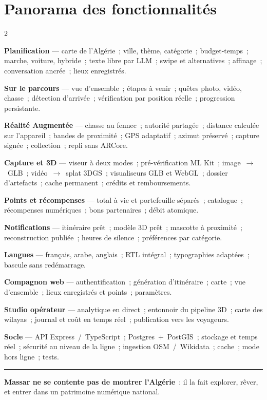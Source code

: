 \documentclass[11pt,a4paper]{article}
\newcommand{\hrulethin}{\vspace{-0.7em}\par\noindent{\color{accent}\rule{\linewidth}{0.5pt}}\par\vspace{-0.45em}}
\begin{document}
\section*{\color{accent}Panorama des fonctionnalités}\hrulethin

{\footnotesize
\begin{multicols}{2}
\raggedright
\textbf{Planification} — carte de l'Algérie~; ville, thème, catégorie~; budget-temps~; marche, voiture, hybride~; texte libre par LLM~; swipe et alternatives~; affinage~; conversation ancrée~; lieux enregistrés.

\textbf{Sur le parcours} — vue d'ensemble~; étapes à venir~; quêtes photo, vidéo, chasse~; détection d'arrivée~; vérification par position réelle~; progression persistante.

\textbf{Réalité Augmentée} — chasse au fennec~; autorité partagée~; distance calculée sur l'appareil~; bandes de proximité~; GPS adaptatif~; azimut préservé~; capture signée~; collection~; repli sans ARCore.

\textbf{Capture et 3D} — viseur à deux modes~; pré-vérification ML Kit~; image~$\rightarrow$~GLB~; vidéo~$\rightarrow$~splat 3DGS~; visualiseurs GLB et WebGL~; dossier d'artefacts~; cache permanent~; crédits et remboursements.

\textbf{Points et récompenses} — total à vie et portefeuille séparés~; catalogue~; récompenses numériques~; bons partenaires~; débit atomique.

\textbf{Notifications} — itinéraire prêt~; modèle 3D prêt~; mascotte à proximité~; reconstruction publiée~; heures de silence~; préférences par catégorie.

\textbf{Langues} — français, arabe, anglais~; RTL intégral~; typographies adaptées~; bascule sans redémarrage.

\textbf{Compagnon web} — authentification~; génération d'itinéraire~; carte~; vue d'ensemble~; lieux enregistrés et points~; paramètres.

\textbf{Studio opérateur} — analytique en direct~; entonnoir du pipeline 3D~; carte des wilayas~; journal et coût en temps réel~; publication vers les voyageurs.

\textbf{Socle} — API Express~/~TypeScript~; Postgres~+~PostGIS~; stockage et temps réel~; sécurité au niveau de la ligne~; ingestion OSM~/~Wikidata~; cache~; mode hors ligne~; tests.
\end{multicols}}

\vspace{0.3em}
{\color{accent}\rule{\linewidth}{0.5pt}}
\vspace{-0.5em}

\begin{center}
\textbf{Massar ne se contente pas de montrer l'Algérie}~: il la fait explorer, rêver, et entrer dans un patrimoine numérique national.
\end{center}
\end{document}
